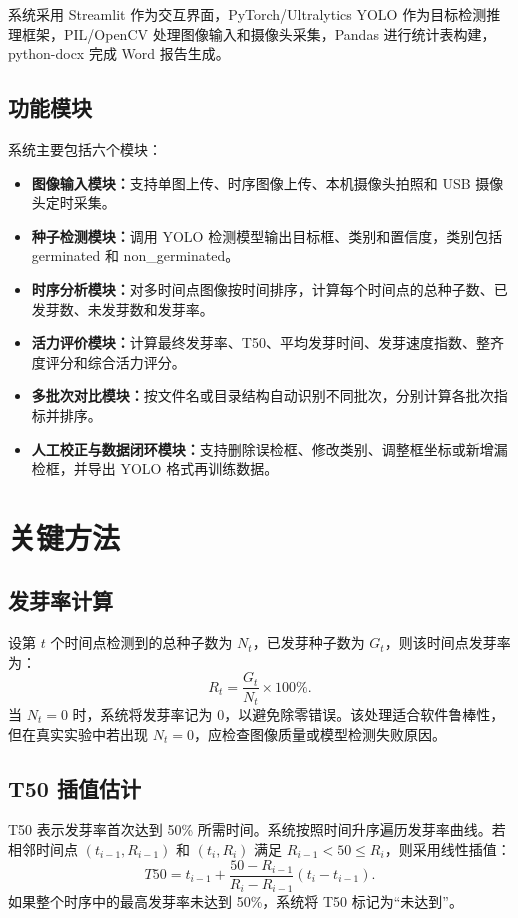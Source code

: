 \documentclass[UTF8,a4paper,zihao=-4]{ctexart}
\begin{document}
系统采用 Streamlit 作为交互界面，PyTorch/Ultralytics YOLO 作为目标检测推理框架，PIL/OpenCV 处理图像输入和摄像头采集，Pandas 进行统计表构建，python-docx 完成 Word 报告生成。

\subsection{功能模块}

系统主要包括六个模块：
\begin{itemize}
  \item \textbf{图像输入模块：}支持单图上传、时序图像上传、本机摄像头拍照和 USB 摄像头定时采集。
  \item \textbf{种子检测模块：}调用 YOLO 检测模型输出目标框、类别和置信度，类别包括 germinated 和 non\_germinated。
  \item \textbf{时序分析模块：}对多时间点图像按时间排序，计算每个时间点的总种子数、已发芽数、未发芽数和发芽率。
  \item \textbf{活力评价模块：}计算最终发芽率、T50、平均发芽时间、发芽速度指数、整齐度评分和综合活力评分。
  \item \textbf{多批次对比模块：}按文件名或目录结构自动识别不同批次，分别计算各批次指标并排序。
  \item \textbf{人工校正与数据闭环模块：}支持删除误检框、修改类别、调整框坐标或新增漏检框，并导出 YOLO 格式再训练数据。
\end{itemize}

\section{关键方法}

\subsection{发芽率计算}

设第 $t$ 个时间点检测到的总种子数为 $N_t$，已发芽种子数为 $G_t$，则该时间点发芽率为：
\begin{equation}
R_t = \frac{G_t}{N_t} \times 100\%.
\end{equation}
当 $N_t=0$ 时，系统将发芽率记为 0，以避免除零错误。该处理适合软件鲁棒性，但在真实实验中若出现 $N_t=0$，应检查图像质量或模型检测失败原因。

\subsection{T50 插值估计}

T50 表示发芽率首次达到 50\% 所需时间。系统按照时间升序遍历发芽率曲线。若相邻时间点 $(t_{i-1},R_{i-1})$ 和 $(t_i,R_i)$ 满足 $R_{i-1}<50\leq R_i$，则采用线性插值：
\begin{equation}
T50=t_{i-1}+\frac{50-R_{i-1}}{R_i-R_{i-1}}(t_i-t_{i-1}).
\end{equation}
如果整个时序中的最高发芽率未达到 50\%，系统将 T50 标记为“未达到”。
\end{document}
